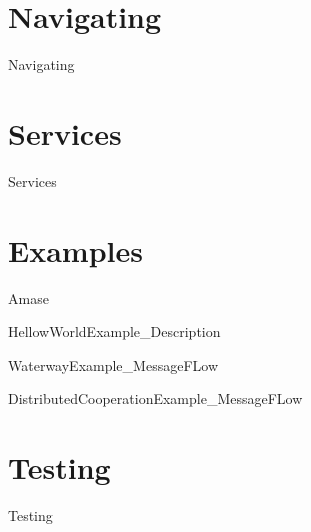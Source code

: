 \documentclass{tufte-book} %
\begin{document}
\chapter{Navigating}
\renewcommand{\FiguresPath}{./Navigating/figures}
{Navigating}


\chapter{Services}
\renewcommand{\FiguresPath}{./Services/figures}
{Services}


\chapter{Examples}


\renewcommand{\FiguresPath}{./Examples/doc_Amase/figures}
{Amase}


\renewcommand{\FiguresPath}{./Examples/doc_HelloWorld/figures}
{HellowWorldExample_Description}

\cleardoublepage

\renewcommand{\FiguresPath}{./Examples/doc_WaterwaySearch/figures}
{WaterwayExample_MessageFLow}

\cleardoublepage

\renewcommand{\FiguresPath}{./Examples/doc_DistributedCooperation/figures}
{DistributedCooperationExample_MessageFLow}


\chapter{Testing}
\renewcommand{\FiguresPath}{./Testing/figures}
{Testing}
\end{document}
